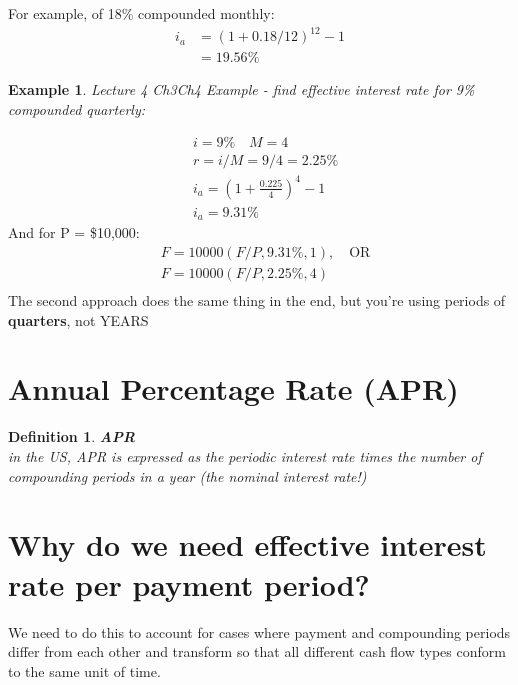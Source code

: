 \documentclass{report} %
\newtheorem{exmp}{Example}
\newtheorem{defn}{Definition}
\begin{document}
For example, of 18\% compounded monthly:
\begin{equation*}
    \begin{aligned}
        i_a &= (1 + 0.18/12)^12 - 1 \\
            &= 19.56\%
    \end{aligned}
\end{equation*}

\begin{exmp}
    Lecture 4 Ch3Ch4 Example - find effective interest rate for 9\% compounded quarterly:
\end{exmp}
\begin{equation*}
    \begin{aligned}
        &i = 9\% \quad M = 4 \\
        &r = i/M = 9/4 = 2.25\% \\
        &i_a = \left(1 + \frac{0.225}{4}\right)^4 - 1 \\
        &i_a = 9.31\%
    \end{aligned}
\end{equation*}
And for P = \$10,000:
\begin{equation*}
    \begin{aligned}
        &F = 10000(F/P,9.31\%,1), \quad \text{OR} \\
        &F = 10000(F/P,2.25\%,4) \\
    \end{aligned}
\end{equation*}
The second approach does the same thing in the end, but you're using periods of \textbf{quarters}, not YEARS

\section*{Annual Percentage Rate (APR)}
\begin{defn}
    \textbf{APR} \\
    in the US, APR is expressed as the periodic interest rate times
    the number of compounding periods in a year (the nominal
    interest rate!)    
\end{defn}

\section*{Why do we need effective interest rate per payment period?}
We need to do this to account for cases where payment and compounding periods differ from each other and transform so that all different cash flow types conform to the same unit of time.
\end{document}
